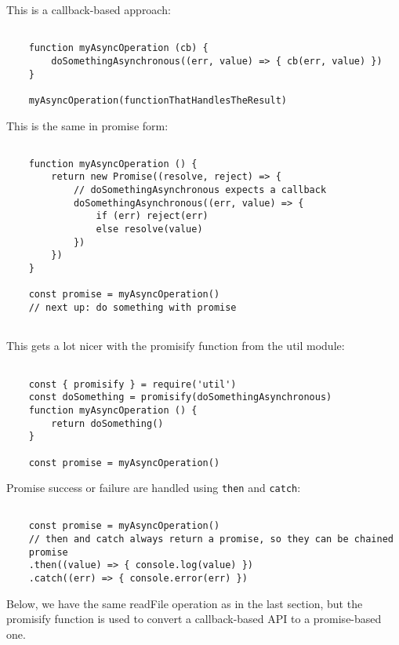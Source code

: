 \documentclass{scrartcl}
\begin{document}
This is a callback-based approach:

\begin{lstlisting}[style=ES6]

    function myAsyncOperation (cb) {
        doSomethingAsynchronous((err, value) => { cb(err, value) })
    }

    myAsyncOperation(functionThatHandlesTheResult)

\end{lstlisting}

This is the same in promise form:

\begin{lstlisting}[style=ES6]

    function myAsyncOperation () {
        return new Promise((resolve, reject) => {
            // doSomethingAsynchronous expects a callback
            doSomethingAsynchronous((err, value) => {
                if (err) reject(err)
                else resolve(value)
            })
        })
    }

    const promise = myAsyncOperation()
    // next up: do something with promise


\end{lstlisting}

This gets a lot nicer with the promisify function from the util module:

\begin{lstlisting}[style=ES6]

    const { promisify } = require('util')
    const doSomething = promisify(doSomethingAsynchronous)
    function myAsyncOperation () {
        return doSomething()
    }

    const promise = myAsyncOperation()

\end{lstlisting}

Promise success or failure are handled using \lstinline|then| and \lstinline|catch|:

\begin{lstlisting}[style=ES6]

    const promise = myAsyncOperation()
    // then and catch always return a promise, so they can be chained
    promise
    .then((value) => { console.log(value) })
    .catch((err) => { console.error(err) })

\end{lstlisting}

Below, we have the same readFile operation as in the last section, but the promisify function is used to convert a callback-based API to a promise-based one.
\end{document}
